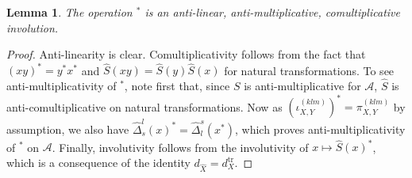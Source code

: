 \documentclass[11pt]{article}
\DeclareMathOperator{\tr}{\mathrm{tr}}
\newtheorem{Lem}[Theorem]{Lemma}
\theoremstyle{definition}
\numberwithin{equation}{section}
\begin{document}
\begin{Lem} The operation $^*$ is an anti-linear, anti-multiplicative, comultiplicative involution.
\end{Lem}

\begin{proof} Anti-linearity is clear. Comultiplicativity follows from the fact that $(xy)^* = y^*x^*$ and $\hat{S}(xy) = \hat{S}(y)\hat{S}(x)$ for natural transformations. To see anti-multiplicativity of $^*$, note first that, since $S$ is anti-multiplicative for $\mathscr{A}$, $\hat{S}$ is anti-comultiplicative on natural transformations. Now as $(\iota_{X,Y}^{(klm)})^* = \pi_{X,Y}^{(klm)}$ by assumption, we also have $\hat{\Delta}^l_s(x)^* = \hat{\Delta}^s_l(x^*)$, which proves anti-multiplicativity of $^*$ on $\mathscr{A}$.  Finally, involutivity follows from the involutivity of $x\mapsto \hat{S}(x)^*$, which is a consequence of the identity $d_{\hat{X}} = d_X^{\tr}$. 
\end{proof}
\end{document}
